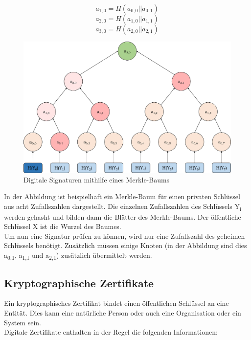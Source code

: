 			\[ a_{1,0} = H(a_{0,0}||a_{0,1}) \]
			\[ a_{2,0} = H(a_{1,0}||a_{1,1}) \]
			\[ a_{3,0} = H(a_{2,0}||a_{2,1}) \]
			
			\begin{figure}[htbp]
				\centering
				\includegraphics[width=\textwidth]{chapters/abb/grundlagen-merkle}
				\caption{Digitale Signaturen mithilfe eines Merkle-Baums}
				\label{fig:grundlagen:merkle}
			\end{figure}
		
			In der Abbildung ist beispielhaft ein Merkle-Baum für einen privaten Schlüssel aus acht Zufallszahlen dargestellt. Die einzelnen Zufallszahlen des Schlüssels Y\textsubscript{i} werden gehasht und bilden dann die Blätter des Merkle-Baums. Der öffentliche Schlüssel X ist die Wurzel des Baumes.\\
		
			Um nun eine Signatur prüfen zu können, wird nur eine Zufallszahl des geheimen Schlüssels benötigt. Zusätzlich müssen einige Knoten (in der Abbildung sind dies a\textsubscript{0,1}, a\textsubscript{1,1} und a\textsubscript{2,1}) zusätzlich übermittelt werden.
			
		\subsection{Kryptographische Zertifikate}
		\label{subsec:grundlagen:krypto:cert}
		
		Ein kryptographisches Zertifikat bindet einen öffentlichen Schlüssel an eine Entität. Dies kann eine natürliche Person oder auch eine Organisation oder ein System sein.\\
		
		Digitale Zertifikate enthalten in der Regel die folgenden Informationen:
		
